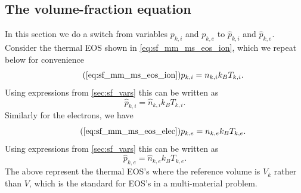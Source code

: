 \documentclass[a4paper,11pt]{report}
\begin{document}
\subsection{The volume-fraction equation}
In this section we do a switch from variables $p_{k,i}$ and $p_{k,e}$ to $\hat{p}_{k,i}$ and $\hat{p}_{k,e}$. Consider the thermal EOS shown in \cref{eq:sf_mm_ms_eos_ion}, which we repeat below for convenience
\begin{equation}
    \tag{\ref{eq:sf_mm_ms_eos_ion}}
    p_{k,i} = n_{k,i} k_B T_{k,i}.
\end{equation}
Using expressions from \cref{sec:sf_vars} this can be written as
\begin{equation}
    \hat{p}_{k,i} = \hat{n}_{k,i} k_B T_{k,i}.
\end{equation}
Similarly for the electrons, we have
\begin{equation}
    \tag{\ref{eq:sf_mm_ms_eos_elec}}
    p_{k,e} = n_{k,e} k_B T_{k,e}.
\end{equation}
Using expressions from \cref{sec:sf_vars} this can be written as
\begin{equation}
    \hat{p}_{k,e} = \hat{n}_{k,e} k_B T_{k,e}.
\end{equation}
The above represent the thermal EOS's where the reference volume is $V_k$ rather than $V$, which is the standard for EOS's in a multi-material problem.
\end{document}
